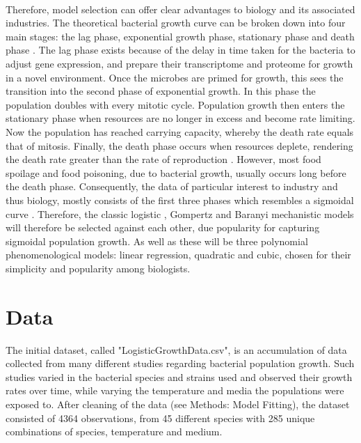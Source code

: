 \documentclass[11pt, a4paper]{article} %
\begin{document}
\paragraph{} Therefore, model selection can offer clear advantages to biology and its associated industries.
The theoretical bacterial growth curve can be broken down into four main stages: the lag phase, exponential growth phase, stationary phase and death phase \citep{RN106}. The lag phase exists because of the delay in time taken for the bacteria to adjust gene expression, and prepare their transcriptome and proteome for growth in a novel environment. Once the microbes are primed for growth, this sees the transition into the second phase of exponential growth. In this phase the population doubles with every mitotic cycle. Population growth then enters the stationary phase when resources are no longer in excess and become rate limiting. Now the population has reached carrying capacity, whereby the death rate equals that of mitosis. Finally, the death phase occurs when resources deplete, rendering the death rate greater than the rate of reproduction \citep{RN106}. However, most food spoilage and food poisoning, due to bacterial growth, usually occurs long before the death phase. Consequently, the data of particular interest to industry and thus biology, mostly consists of the first three phases which resembles a sigmoidal curve \citep{RN110}. Therefore, the classic logistic \citep{RN106}, Gompertz \citep{RN73} and Baranyi \citep{RN110} mechanistic models will therefore be selected against each other, due popularity for capturing sigmoidal population growth. As well as these will be three polynomial phenomenological models: linear regression, quadratic and cubic, chosen for their simplicity and popularity among biologists.

\section{Data}

The initial dataset, called "LogisticGrowthData.csv", is an accumulation of data collected from many different studies regarding bacterial population growth. Such studies varied in the bacterial species and strains used and observed their growth rates over time, while varying the temperature and media the populations were exposed to. After cleaning of the data (see Methods: Model Fitting), the dataset consisted of 4364 observations, from 45 different species with 285 unique combinations of species, temperature and medium. 
\end{document}
